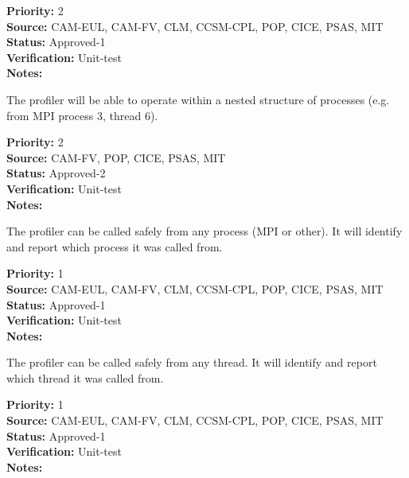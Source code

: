 \begin{reqlist}
{\bf Priority:} 2 \\
{\bf Source:} CAM-EUL, CAM-FV, CLM, CCSM-CPL, POP, CICE, PSAS, MIT \\
{\bf Status:} Approved-1 \\
{\bf Verification:} Unit-test\\
{\bf Notes:} 
\end{reqlist}


The profiler will be able to operate within a nested structure of processes (e.g.
from MPI process 3, thread 6).

\begin{reqlist}
{\bf Priority:} 2 \\
{\bf Source:}  CAM-FV, POP, CICE, PSAS, MIT \\
{\bf Status:} Approved-2 \\
{\bf Verification:} Unit-test \\
{\bf Notes:} 
\end{reqlist}


The profiler can be called safely from any process (MPI or other).  It will 
identify and report which process it was called from.

\begin{reqlist}
{\bf Priority:} 1 \\
{\bf Source:} CAM-EUL, CAM-FV, CLM, CCSM-CPL, POP, CICE, PSAS, MIT \\
{\bf Status:} Approved-1 \\
{\bf Verification:} Unit-test \\
{\bf Notes:} 
\end{reqlist}


The profiler can be called safely from any thread.  It will 
identify and report which thread it was called from.

\begin{reqlist}
{\bf Priority:} 1 \\
{\bf Source:} CAM-EUL, CAM-FV, CLM, CCSM-CPL, POP, CICE, PSAS, MIT \\
{\bf Status:} Approved-1 \\
{\bf Verification:} Unit-test \\
{\bf Notes:} 
\end{reqlist}


